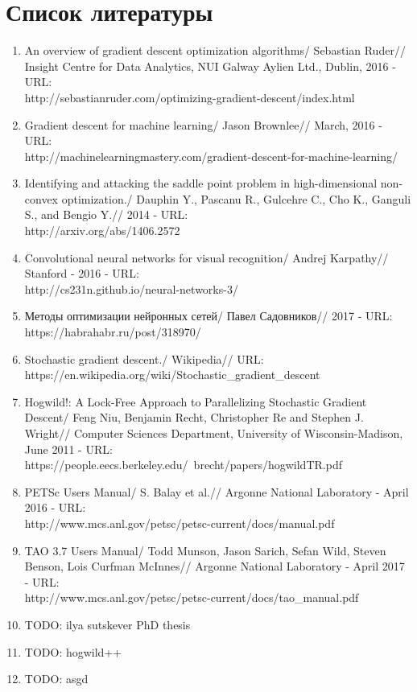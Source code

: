 \documentclass[12pt]{report}
\begin{document}
  \chapter*{Список литературы}
  \begin{enumerate}
    \item
    An overview of gradient descent optimization algorithms/
    Sebastian Ruder//
    Insight Centre for Data Analytics, NUI Galway Aylien Ltd., Dublin, 2016 - URL:\\
    http://sebastianruder.com/optimizing-gradient-descent/index.html
    \item
    Gradient descent for machine learning/
    Jason Brownlee//
    March, 2016 - URL:\\
    http://machinelearningmastery.com/gradient-descent-for-machine-learning/
    \item
    Identifying and attacking the saddle point problem in high-dimensional
    non-convex optimization./
    Dauphin Y., Pascanu R., Gulcehre C., Cho K., Ganguli S., and Bengio Y.//
    2014 - URL:\\
    http://arxiv.org/abs/1406.2572
    \item
    Convolutional neural networks for visual recognition/
    Andrej Karpathy//
    Stanford - 2016 - URL:\\
    http://cs231n.github.io/neural-networks-3/
    \item
    Методы оптимизации нейронных сетей/
    Павел Садовников//
    2017 - URL:\\
    https://habrahabr.ru/post/318970/
    \item
    Stochastic gradient descent./
    Wikipedia//
    URL:\\
    https://en.wikipedia.org/wiki/Stochastic\_gradient\_descent
    \item
    Hogwild!: A Lock-Free Approach to Parallelizing Stochastic Gradient Descent/
    Feng Niu, Benjamin Recht, Christopher Re and Stephen J. Wright//
    Computer Sciences Department, University of Wisconsin-Madison, June 2011 - URL:\\
    https://people.eecs.berkeley.edu/~brecht/papers/hogwildTR.pdf
    \item
    PETSc Users Manual/
    S. Balay et al.//
    Argonne National Laboratory - April 2016 - URL:\\
    http://www.mcs.anl.gov/petsc/petsc-current/docs/manual.pdf
    \item
    TAO 3.7 Users Manual/
    Todd Munson, Jason Sarich, Sefan Wild, Steven Benson, Lois Curfman McInnes//
    Argonne National Laboratory - April 2017 - URL:\\
    http://www.mcs.anl.gov/petsc/petsc-current/docs/tao\_manual.pdf
    \item
    {TODO: ilya sutskever PhD thesis}
    \item
    {TODO: hogwild++}
    \item
    {TODO: asgd}
  \end{enumerate}
\end{document}
